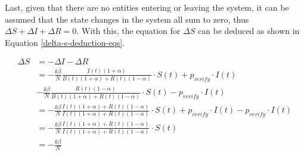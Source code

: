 Last, given that there are no entities entering or leaving the system,
it can be assumed that the state changes in the system all sum to zero,
thus $\Delta S+ \Delta I+ \Delta R = 0$. With this, the equation for
$\Delta S$ can be deduced as shown in Equation \ref{delta-s-deduction-eqs}.

\begin{align}
    \Delta S &= - \Delta I - \Delta R \nonumber\\
     &= -\frac{k\beta}{N} \frac{I(t)(1+\alpha)}{B(t)(1+\alpha)+R(t)(1-\alpha)}
     \cdot S(t) + p_{verify}\cdot I(t) \nonumber\\
      & -\frac{k\beta}{N} \frac{R(t)(1-\alpha)}{B(t)(1+\alpha)+R(t)(1-\alpha)} 
      \cdot S(t) - p_{verify}\cdot I(t) \nonumber\\
      &= -\frac{k\beta}{N} \frac{I(t)(1+\alpha) + R(t)(1-\alpha)}{I(t)(1+\alpha)+R(t)(1-\alpha)}
      \cdot S(t) + p_{verify}\cdot I(t) - p_{verify}\cdot I(t) \nonumber\\
      &= -\frac{k\beta}{N} \frac{I(t)(1+\alpha) + R(t)(1-\alpha)}{I(t)(1+\alpha)+R(t)(1-\alpha)}
      \cdot S(t) \nonumber\\
      &= -\frac{k\beta}{N} \label{delta-s-deduction-eqs}
\end{align}
